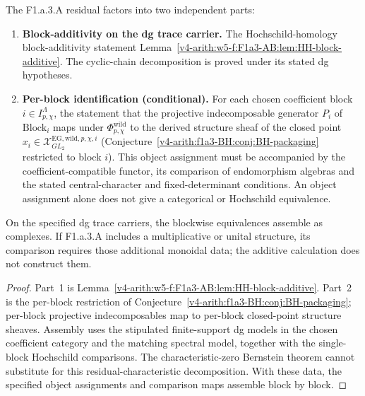 \begin{proposition}
\label{v4-arith:w5-f:F1a3-AB:prop:A-residual-taxonomy}
\ClaimStatusProvedHere The F1.a.3.A residual factors into two
independent parts:
\begin{enumerate}
\item \textbf{Block-additivity on the dg trace carrier.} The
Hochschild-homology block-additivity statement
Lemma~\ref{v4-arith:w5-f:F1a3-AB:lem:HH-block-additive}. The cyclic-chain decomposition is proved under its stated dg hypotheses.
\item \textbf{Per-block identification (conditional).} For each chosen coefficient block $i\in I_{p,\chi}^{\Lambda}$, the statement that the projective
indecomposable generator \(P_{i}\) of \(\mathrm{Block}_{i}\)
maps under \(\Phi^{\mathrm{wild}}_{p,\chi}\) to the derived structure
sheaf of the closed point
\(x_{i}\in\mathcal{X}^{\mathrm{EG,wild},p,\chi,i}_{GL_{2}}\)
(Conjecture~\ref{v4-arith:f1a3-BH:conj:BH-packaging} restricted to block
\(i\)). This object assignment must be accompanied by the coefficient-compatible
functor, its comparison of endomorphism algebras and the stated
central-character and fixed-determinant conditions. An object
assignment alone does not give a categorical or Hochschild equivalence.
\end{enumerate}
On the specified dg trace carriers, the blockwise equivalences
assemble as complexes. If F1.a.3.A includes a multiplicative or
unital structure, its comparison requires those additional monoidal
data; the additive calculation does not construct them.
\end{proposition}

\begin{proof}
Part~1 is Lemma~\ref{v4-arith:w5-f:F1a3-AB:lem:HH-block-additive}. Part~2
is the per-block restriction of
Conjecture~\ref{v4-arith:f1a3-BH:conj:BH-packaging}; per-block projective
indecomposables map to per-block closed-point structure sheaves.
Assembly uses the stipulated finite-support dg models in the chosen
coefficient category and the matching spectral model, together
with the single-block Hochschild comparisons. The characteristic-zero
Bernstein theorem cannot substitute for this residual-characteristic
decomposition. With these data, the specified object assignments and
comparison maps assemble block by block.
\end{proof}

